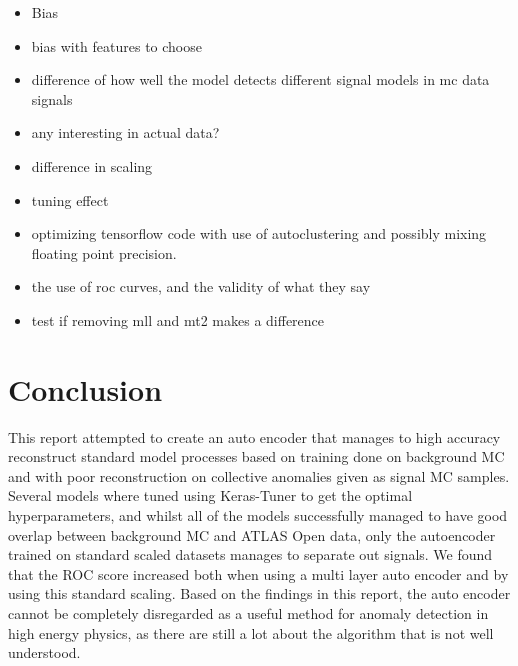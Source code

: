 \documentclass[ reprint, amsmath,amssymb, aps, nofootinbib]{revtex4-2}
\begin{document}
\begin{itemize}
    \item Bias 
    \item bias with features to choose
    \item difference of how well the model detects different signal models in mc data signals
    \item any interesting in actual data?
    \item difference in scaling
    \item tuning effect
    \item optimizing tensorflow code with use of autoclustering and possibly mixing floating point precision. 
    \item the use of roc curves, and the validity of what they say
    \item test if removing mll and mt2 makes a difference
    
\end{itemize}


\section{Conclusion}
This report attempted to create an auto encoder that manages to high accuracy reconstruct standard model processes based on training done on background MC and with poor reconstruction on collective anomalies given as signal MC samples. Several models where tuned using Keras-Tuner to get the optimal hyperparameters, and whilst all of the models successfully managed to have good overlap between background MC and ATLAS Open data, only the autoencoder trained on standard scaled datasets manages to separate out signals. We found that the ROC score increased both when using a multi layer auto encoder and by using this standard scaling. Based on the findings in this report, the auto encoder cannot be completely disregarded as a useful method for anomaly detection in high energy physics, as there are still a lot about the algorithm that is not well understood. 


\clearpage
\newpage
\mbox{~}
\onecolumngrid
\printbibliography

\newpage
\appendix
\end{document}
